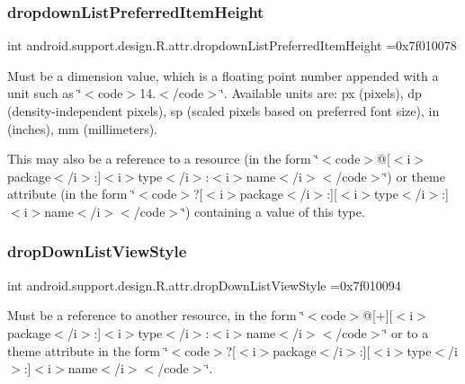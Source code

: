 \subsubsection{\texorpdfstring{dropdown\+List\+Preferred\+Item\+Height}{dropdownListPreferredItemHeight}}
{\footnotesize\ttfamily int android.\+support.\+design.\+R.\+attr.\+dropdown\+List\+Preferred\+Item\+Height =0x7f010078\hspace{0.3cm}{\ttfamily [static]}}

Must be a dimension value, which is a floating point number appended with a unit such as \char`\"{}$<$code$>$14.\+5sp$<$/code$>$\char`\"{}. Available units are\+: px (pixels), dp (density-\/independent pixels), sp (scaled pixels based on preferred font size), in (inches), mm (millimeters). 

This may also be a reference to a resource (in the form \char`\"{}$<$code$>$@\mbox{[}$<$i$>$package$<$/i$>$\+:\mbox{]}$<$i$>$type$<$/i$>$\+:$<$i$>$name$<$/i$>$$<$/code$>$\char`\"{}) or theme attribute (in the form \char`\"{}$<$code$>$?\mbox{[}$<$i$>$package$<$/i$>$\+:\mbox{]}\mbox{[}$<$i$>$type$<$/i$>$\+:\mbox{]}$<$i$>$name$<$/i$>$$<$/code$>$\char`\"{}) containing a value of this type. \mbox{\label{classandroid_1_1support_1_1design_1_1R_1_1attr_ae3bfc4373a4b49924e4173313505b015}} 
\subsubsection{\texorpdfstring{drop\+Down\+List\+View\+Style}{dropDownListViewStyle}}
{\footnotesize\ttfamily int android.\+support.\+design.\+R.\+attr.\+drop\+Down\+List\+View\+Style =0x7f010094\hspace{0.3cm}{\ttfamily [static]}}

Must be a reference to another resource, in the form \char`\"{}$<$code$>$@\mbox{[}+\mbox{]}\mbox{[}$<$i$>$package$<$/i$>$\+:\mbox{]}$<$i$>$type$<$/i$>$\+:$<$i$>$name$<$/i$>$$<$/code$>$\char`\"{} or to a theme attribute in the form \char`\"{}$<$code$>$?\mbox{[}$<$i$>$package$<$/i$>$\+:\mbox{]}\mbox{[}$<$i$>$type$<$/i$>$\+:\mbox{]}$<$i$>$name$<$/i$>$$<$/code$>$\char`\"{}. \mbox{\label{classandroid_1_1support_1_1design_1_1R_1_1attr_a49b2c6643751648743fe12e507b2f5e8}} 
